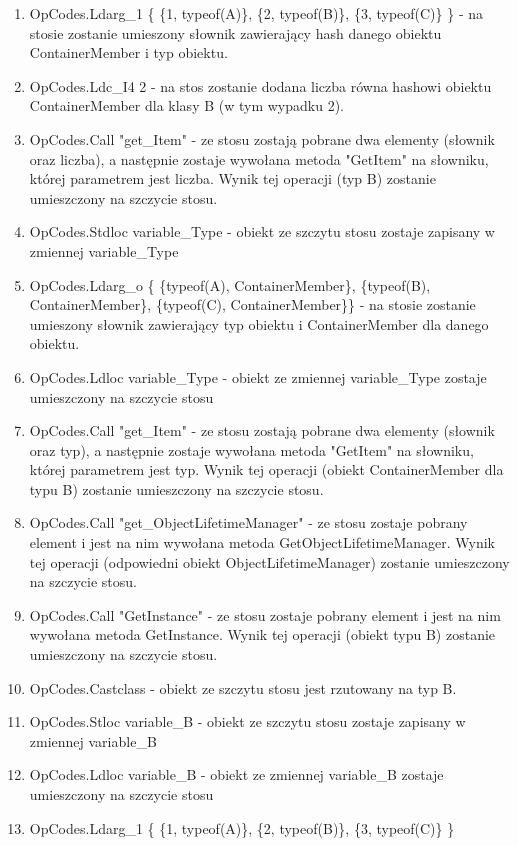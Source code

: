 \documentclass[12pt]{article}
\begin{document}
\begin{enumerate}
	\item OpCodes.Ldarg\_1 \{ \{1, typeof(A)\}, \{2, typeof(B)\}, \{3, typeof(C)\} \} - na stosie zostanie umieszony słownik zawierający hash danego obiektu ContainerMember i typ obiektu.
	\item OpCodes.Ldc\_I4 2 - na stos zostanie dodana liczba równa hashowi obiektu ContainerMember dla klasy B (w tym wypadku 2).
	\item OpCodes.Call "get\_Item" - ze stosu zostają pobrane dwa elementy (słownik oraz liczba), a następnie zostaje wywołana metoda "GetItem" na słowniku, której parametrem jest liczba. Wynik tej operacji (typ B) zostanie umieszczony na szczycie stosu.
	\item OpCodes.Stdloc variable\_Type - obiekt ze szczytu stosu zostaje zapisany w zmiennej variable\_Type
	\item OpCodes.Ldarg\_o  \{ \{typeof(A), ContainerMember\}, \{typeof(B), ContainerMember\}, \{typeof(C), ContainerMember\}\} - na stosie zostanie umieszony słownik zawierający typ obiektu i ContainerMember dla danego obiektu.
	\item OpCodes.Ldloc variable\_Type -  obiekt ze zmiennej variable\_Type zostaje umieszczony na szczycie stosu
	\item OpCodes.Call "get\_Item"  - ze stosu zostają pobrane dwa elementy (słownik oraz typ), a następnie zostaje wywołana metoda "GetItem" na słowniku, której parametrem jest typ. Wynik tej operacji (obiekt ContainerMember dla typu B) zostanie umieszczony na szczycie stosu.
	\item OpCodes.Call "get\_ObjectLifetimeManager" - ze stosu zostaje pobrany element i jest na nim wywołana metoda GetObjectLifetimeManager. Wynik tej operacji (odpowiedni obiekt ObjectLifetimeManager) zostanie umieszczony na szczycie stosu.
	\item OpCodes.Call "GetInstance" - ze stosu zostaje pobrany element i jest na nim wywołana metoda GetInstance. Wynik tej operacji (obiekt typu B) zostanie umieszczony na szczycie stosu.
	\item OpCodes.Castclass - obiekt ze szczytu stosu jest rzutowany na typ B.
	\item OpCodes.Stloc variable\_B - obiekt ze szczytu stosu zostaje zapisany w zmiennej variable\_B
	\item OpCodes.Ldloc variable\_B - obiekt ze zmiennej variable\_B zostaje umieszczony na szczycie stosu
	\item OpCodes.Ldarg\_1 \{ \{1, typeof(A)\}, \{2, typeof(B)\}, \{3, typeof(C)\} \}

\end{enumerate}
\end{document}
